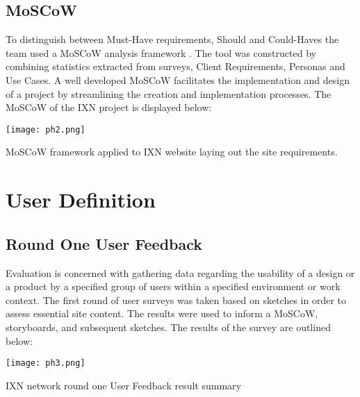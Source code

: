 \documentclass[fontsize=11pt]{extarticle}
\numberwithin{figure}{section} %
\numberwithin{table}{section}%
\begin{document}
\hypertarget{moscow}{%
\subsection{MoSCoW}\label{moscow}}

To distinguish between Must-Have requirements, Should and Could-Haves
the team used a MoSCoW analysis framework \cite{g4}. The tool was
constructed by combining statistics extracted from surveys, Client
Requirements, Personas and Use Cases. A well developed MoSCoW
facilitates the implementation and design of a project by streamlining
the creation and implementation processes. The MoSCoW of the IXN project
is displayed below:

\newpage

\begin{landscape}
\begin{table}[H]
      \centering
      \texttt{[image: ph2.png]}
      \caption{MoSCoW framework applied to IXN website laying out the site requirements.}
 \end{table}
 \end{landscape}

\newpage

\hypertarget{user-definition}{%
\section{User Definition}\label{user-definition}}

\hypertarget{round-one-user-feedback}{%
\subsection{Round One User Feedback}\label{round-one-user-feedback}}

Evaluation is concerned with gathering data regarding the usability of a
design or a product by a specified group of users within a specified
environment or work context. The first round of user surveys was taken
based on sketches in order to assess essential site content. The results
were used to inform a MoSCoW, storyboards, and subsequent sketches. The
results of the survey are outlined below:

\begin{table}[H]
      \centering
      \texttt{[image: ph3.png]}
      \caption{IXN network round one User Feedback result summary}
\label{userfeedback}
 \end{table}
\end{document}
